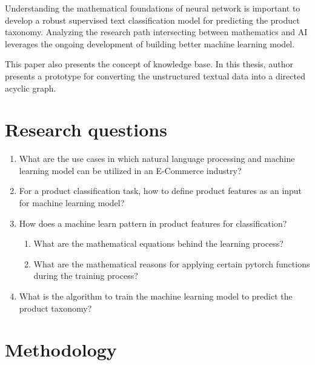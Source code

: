 Understanding the mathematical foundations of neural network is important to develop a robust supervised text classification model for predicting the product taxonomy. Analyzing the research path intersecting between mathematics and \acl{AI} leverages the ongoing development of building better machine learning model.  

 This paper also presents the concept of knowledge base. In this thesis, author presents a prototype for converting the unstructured textual data into a directed acyclic graph. 

\section{Research questions}

\begin{enumerate}[label=\textbf{RQ\arabic*:}]
    \item What are the use cases in which natural language processing and machine learning model can be utilized in an E-Commerce industry?
   
    
    \item For a product classification task, how to define product features as an input for machine learning model?
    
    \item How does a machine learn pattern in product features for classification?
    

    \begin{enumerate}[label=\textbf{SRQ\arabic*:}]
        \item What are the mathematical equations behind the learning process?
    
        
        \item What are the mathematical reasons for applying certain pytorch functions during the training process? 
        
         

    \end{enumerate}
    
    \item What is the algorithm to train the machine learning model to predict the product taxonomy?
  

  \end{enumerate}

\section{Methodology}

